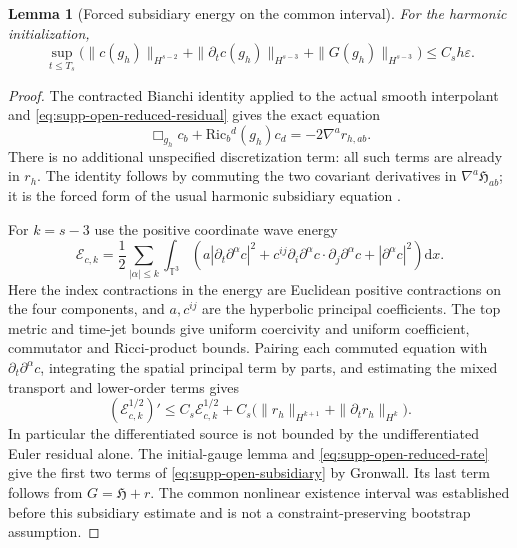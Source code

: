 \documentclass[11pt]{article}
\numberwithin{equation}{section}
\newtheorem{lemma}[lemma]{Lemma}
\theoremstyle{definition}
\theoremstyle{remark}
\newcommand{\dd}{\mathrm d}
\newcommand{\Ric}{\mathrm{Ric}}
\begin{document}
\begin{lemma}[Forced subsidiary energy on the common interval]
\label{lem:supp-open-subsidiary}
For the harmonic initialization,
\begin{equation}
 \sup_{t\le T_s}\bigl(
 \|c(g_h)\|_{H^{s-2}}+\|\partial_tc(g_h)\|_{H^{s-3}}
 +\|G(g_h)\|_{H^{s-3}}\bigr)\le C_sh\varepsilon.
 \label{eq:supp-open-subsidiary}
\end{equation}
\end{lemma}
\begin{proof}
The contracted Bianchi identity applied to the actual smooth interpolant
and \eqref{eq:supp-open-reduced-residual} gives the exact equation
\begin{equation}
 \Box_{g_h}c_b+\Ric_b{}^d(g_h)c_d=-2\nabla^ar_{h,ab}.
 \label{eq:supp-open-exact-subsidiary}
\end{equation}
There is no additional unspecified discretization term: all such terms are
already in $r_h$.  The identity follows by commuting the two covariant
derivatives in $\nabla^a\mathfrak H_{ab}$; it is the forced form of the
usual harmonic subsidiary equation \cite[Sec.~2.1]{Lindblom2006}.

For $k=s-3$ use the positive coordinate wave energy
\[
 \mathcal E_{c,k}=\frac12\sum_{|\alpha|\le k}\int_{\mathbb T^3}
 \left(a|\partial_t\partial^\alpha c|^2
 +c^{ij}\partial_i\partial^\alpha c\cdot
             \partial_j\partial^\alpha c
 +|\partial^\alpha c|^2\right)\dd x.
\]
Here the index contractions in the energy are Euclidean positive
contractions on the four components, and $a,c^{ij}$ are the hyperbolic
principal coefficients.  The top metric and time-jet bounds give uniform
coercivity and uniform coefficient, commutator and Ricci-product bounds.
Pairing each commuted equation with
$\partial_t\partial^\alpha c$, integrating the spatial principal term by
parts, and estimating the mixed transport and lower-order terms gives
\begin{equation}
 (\mathcal E_{c,k}^{1/2})'
 \le C_s\mathcal E_{c,k}^{1/2}
       +C_s\bigl(\|r_h\|_{H^{k+1}}
                         +\|\partial_tr_h\|_{H^k}\bigr).
 \label{eq:supp-open-subsidiary-energy}
\end{equation}
In particular the differentiated source is not bounded by the
undifferentiated Euler residual alone.  The initial-gauge lemma and
\eqref{eq:supp-open-reduced-rate} give the first two terms of
\eqref{eq:supp-open-subsidiary} by Gronwall.  Its last term follows from
$G=\mathfrak H+r$.  The common nonlinear existence interval was established
before this subsidiary estimate and is not a constraint-preserving
bootstrap assumption.
\end{proof}
\end{document}
